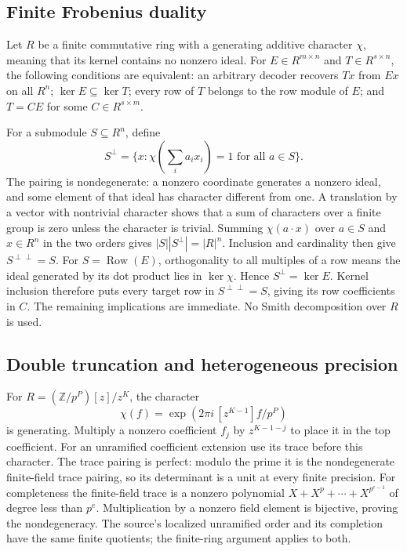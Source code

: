 \documentclass[
  11pt,
]{article}
\begin{document}
\subsection{Finite Frobenius duality}\label{v8-finite-frobenius-duality}

Let \(R\) be a finite commutative ring with a generating additive
character \(\chi\), meaning that its kernel contains no nonzero ideal.
For \(E\in R^{m\times n}\) and \(T\in R^{s\times n}\), the following
conditions are equivalent: an arbitrary decoder recovers \(Tx\) from
\(Ex\) on all \(R^n\); \(\ker E\subseteq\ker T\); every row of \(T\)
belongs to the row module of \(E\); and \(T=CE\) for some
\(C\in R^{s\times m}\).

For a submodule \(S\subseteq R^n\), define \[
 S^\perp=\{x:\chi(\sum_i a_i x_i)=1\text{ for all }a\in S\}.
\] The pairing is nondegenerate: a nonzero coordinate generates a
nonzero ideal, and some element of that ideal has character different
from one. A translation by a vector with nontrivial character shows that
a sum of characters over a finite group is zero unless the character is
trivial. Summing \(\chi(a\cdot x)\) over \(a\in S\) and \(x\in R^n\) in
the two orders gives \(|S||S^\perp|=|R|^n\). Inclusion and cardinality
then give \(S^{\perp\perp}=S\). For \(S=\operatorname{Row}(E)\),
orthogonality to all multiples of a row means the ideal generated by its
dot product lies in \(\ker\chi\). Hence \(S^\perp=\ker E\). Kernel
inclusion therefore puts every target row in \(S^{\perp\perp}=S\),
giving its row coefficients in \(C\). The remaining implications are
immediate. No Smith decomposition over \(R\) is used.

\subsection{Double truncation and heterogeneous
precision}\label{v8-double-truncation-and-heterogeneous-precision}

For \(R=(\mathbb Z/p^P)[z]/z^K\), the character \[
 \chi(f)=\exp\left(2\pi i\,[z^{K-1}]f/p^P\right)
\] is generating. Multiply a nonzero coefficient \(f_j\) by
\(z^{K-1-j}\) to place it in the top coefficient. For an unramified
coefficient extension use its trace before this character. The trace
pairing is perfect: modulo the prime it is the nondegenerate
finite-field trace pairing, so its determinant is a unit at every finite
precision. For completeness the finite-field trace is a nonzero
polynomial \(X+X^p+\cdots+X^{p^{e-1}}\) of degree less than \(p^e\).
Multiplication by a nonzero field element is bijective, proving the
nondegeneracy. The source's localized unramified order and its
completion have the same finite quotients; the finite-ring argument
applies to both.
\end{document}
